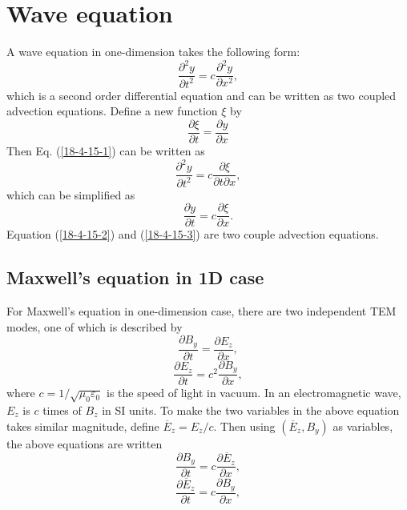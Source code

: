 \documentclass{article}
\begin{document}
\

\

\section{Wave equation}

A wave equation in one-dimension takes the following form:
\begin{equation}
  \label{18-4-15-1} \frac{\partial^2 y}{\partial t^2} = c \frac{\partial^2
  y}{\partial x^2},
\end{equation}
which is a second order differential equation and can be written as two
coupled advection equations. Define a new function $\xi$ by
\begin{equation}
  \label{18-4-15-2} \frac{\partial \xi}{\partial t} = \frac{\partial
  y}{\partial x}
\end{equation}
Then Eq. (\ref{18-4-15-1}) can be written as
\begin{equation}
  \frac{\partial^2 y}{\partial t^2} = c \frac{\partial \xi}{\partial t
  \partial x},
\end{equation}
which can be simplified as
\begin{equation}
  \label{18-4-15-3}  \frac{\partial y}{\partial t} = c \frac{\partial
  \xi}{\partial x} .
\end{equation}
Equation (\ref{18-4-15-2}) and (\ref{18-4-15-3}) are two couple advection
equations.

\subsection{Maxwell's equation in 1D case}

For Maxwell's equation in one-dimension case, there are two independent TEM
modes, one of which is described by
\begin{equation}
  \frac{\partial B_y}{\partial t} = \frac{\partial E_z}{\partial x},
\end{equation}
\begin{equation}
  \frac{\partial E_z}{\partial t} = c^2 \frac{\partial B_y}{\partial x},
\end{equation}
where $c = 1 / \sqrt{\mu_0 \varepsilon_0}$ is the speed of light in vacuum. In
an electromagnetic wave, $E_z$ is $c$ times of $B_z$ in SI units. To make the
two variables in the above equation takes similar magnitude, define
$\overline{E}_z = E_z / c$. Then using $(\overline{E}_z, B_y)$ as variables,
the above equations are written
\begin{equation}
  \label{18-4-15-4} \frac{\partial B_y}{\partial t} = c \frac{\partial
  \overline{E}_z}{\partial x},
\end{equation}
\begin{equation}
  \label{18-4-15-5} \frac{\partial \overline{E}_z}{\partial t} = c
  \frac{\partial B_y}{\partial x},
\end{equation}
\end{document}

